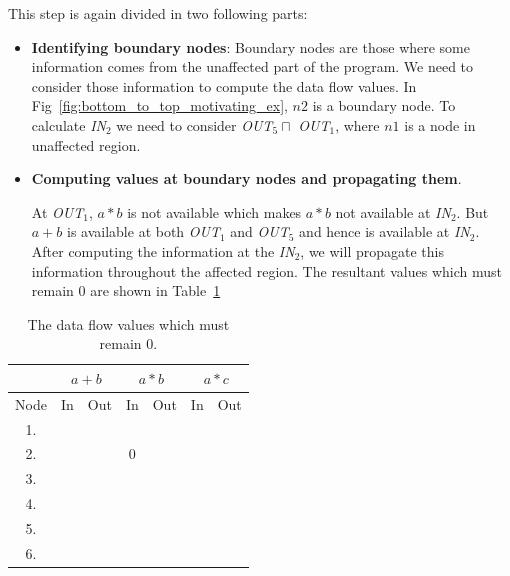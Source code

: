 \documentclass[11pt,a4paper,openright]{report}
\begin{document}
\begin{itemize}
This step is again divided in two following parts:

\begin{itemize}
\item \textbf{Identifying boundary nodes}: Boundary nodes are those where some information comes from the unaffected part of the program. We need to consider 
those information to compute the data flow values. In Fig~\ref{fig:bottom_to_top_motivating_ex}, $n2$ is a boundary node. To calculate \textit{IN}$_2$ we need to consider
\textit{OUT}$_5 \sqcap$ \textit{OUT}$_1$, where $n1$ is a node in unaffected region. 

\item  \textbf{Computing values at boundary nodes and propagating them}.

At \textit{OUT}$_1$, $a*b$ is not available which makes $a*b$ not available at \textit{IN}$_2$. But $a+b$ is available at both \textit{OUT}$_1$ and \textit{OUT}$_5$ and hence is available at \textit{IN}$_2$.
After computing the information at the \textit{IN}$_2$, we will propagate this information throughout the affected region. The resultant values which must remain 0 are shown
in Table~\ref{tab:Available_exp_which_remain_0}
\end{itemize}

\begin{table}[H]
  \begin{center}
    \begin{tabular}{c c c c c c c }
    \hline
       & \multicolumn{2}{c}{$a+b$} & \multicolumn{2}{c}{$a*b$} & \multicolumn{2}{c}{$a*c$} \\
    \hline
      Node & In & Out & In & Out & In & Out\\
   	\midrule
   	  1. &  &  &  &  &  &  \\
   	  2. &  &  &0&  &  &  \\
   	  3. &  &  &  &  &  &  \\
   	  4. &  &  &  &  &  &  \\
   	  5. &  &  &  &  &  &  \\
   	  6. &  &  &  &  &  & \\
      
      \bottomrule 
    \end{tabular}
    \caption{The data flow values which must remain 0.}
      \label{tab:Available_exp_which_remain_0}
  \end{center}
\end{table}

\end{itemize}  
\end{document}
